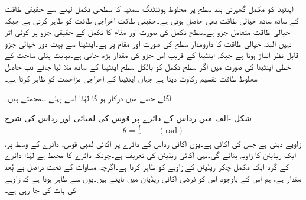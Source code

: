 اینٹینا کو مکمل گھیرتی بند سطح پر مخلوط پوئنٹنگ سمتیہ کا سطحی تکمل لینے سے حقیقی طاقت کے ساتھ ساتھ خیالی طاقت بھی حاصل ہوتی ہے۔حقیقی طاقت اخراجی طاقت کو ظاہر کرتی ہے جبکہ خیالی طاقت  متعامل جزو ہے۔سطح تکمل کی صورت اور مقام کا تکمل کے حقیقی جزو پر کوئی اثر نہیں البتہ خیالی طاقت کا دارومدار سطح کی صورت اور مقام پر ہے۔اینٹینا سے بہت دور خیالی جزو قابل نظر انداز ہوتا ہے جبکہ اینٹینا کے قریب اس جزو کی مقدار بڑھ جاتی ہے۔نہایت پتلی ساخت کے خطی اینٹینا کی صورت میں اگر سطح تکمل کو بالکل سطح اینٹینا کے ساتھ ملا لیا جائے تب حاصل مخلوط طاقت تقسیم  رکاوٹ  دیتا ہے جہاں  اینٹینا کے اخراجی مزاحمت کو ظاہر کرتا ہے۔

اگلے حصے میں  درکار ہو گا لہٰذا اسے پہلے سمجھتے ہیں۔

شکل -الف میں رداس  کے دائرے پر قوس کی لمبائی  اور  رداس  کی شرح
\begin{align}\label{مساوات_اینٹینا_ریڈیئن_تعریف}
\theta=\frac{l}{r} \quad \quad (\si{\radian})
\end{align}
 زاویے  دیتی ہے جس کی اکائی   ہے۔یوں اکائی رداس کے دائرے پر اکائی لمبی قوس، دائرے کے وسط پر، ایک ریڈیئن  کا زاویہ بنائے گی۔یہی اکائی ریڈیئن کی تعریف ہے۔چونکہ دائرے کا محیط  ہے لہٰذا دائرے کے گرد ایک مکمل چکر  ریڈیئن  کے زاویے کو ظاہر کرتا ہے۔اگرچہ مساوات  کے تحت  دراصل بے بُعد مقدار ہے، ہم اس کے باوجود اس کو فرضی اکائی ریڈیئن میں ناپتے ہیں۔یوں  سے ظاہر ہوتا ہے کہ  زاویے کی بات کی جا رہی ہے۔

